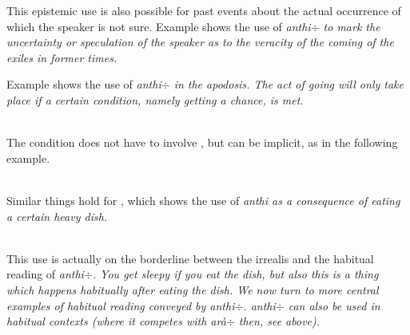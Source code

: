 This epistemic use is also possible for past events about the actual occurrence of which the speaker is not sure. Example  shows the use of \em anthi$\div$ \em to mark the uncertainty or speculation of the speaker as to the veracity of the coming of the exiles in former times.



Example  shows the use of \em anthi$\div$ \em in the apodosis. The act of going will only take place if a certain condition, namely getting a chance, is met.

\\

The condition does not have to involve , but can be implicit, as in the following example.

 \\

Similar things hold for , which shows the use of \em anthi \em as a consequence of eating a certain heavy dish.



 \\

This use is actually on the borderline between the irrealis and the habitual reading of \em anthi$\div$\em. You get sleepy \em if \em you eat the dish, but also this is a thing which happens \em  habitually \em after eating the dish. We now turn to more central examples of habitual reading conveyed by \em anthi$\div$\em.
 \em anthi$\div$ \em  can also be used in habitual contexts (where it competes with  \em arà$\div$ \em  then, see above).


